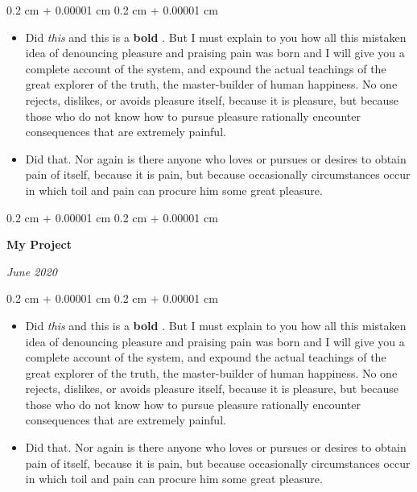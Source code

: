 \documentclass[10pt, letterpaper]{article}
\newenvironment{highlights}{
    \begin{itemize}[
        topsep=0.10 cm,
        parsep=0.10 cm,
        partopsep=0pt,
        itemsep=0pt,
        leftmargin=0.4 cm + 10pt
    ]
}{
    \end{itemize}
} %
\newenvironment{onecolentry}{
    \begin{adjustwidth}{
        0.2 cm + 0.00001 cm
    }{
        0.2 cm + 0.00001 cm
    }
}{
    \end{adjustwidth}
} %
\newenvironment{twocolentry}[2][]{
    \onecolentry
    \def\secondColumn{#2}
    \setcolumnwidth{\fill, 4.5 cm}
    \begin{paracol}{2}
}{
    \switchcolumn \raggedleft \secondColumn
    \end{paracol}
    \endonecolentry
} %
\let\hrefWithoutArrow\href
\renewcommand{\href}[2]{\hrefWithoutArrow{#1}{\ifthenelse{\equal{#2}{}}{ }{#2 }\raisebox{.15ex}{\footnotesize \faExternalLink*}}}
\begin{document}
        \vspace{0.10 cm}
        \begin{onecolentry}
            \begin{highlights}
                \item Did \textit{this} and this is a \textbf{bold} \href{https://example.com}{link}. But I must explain to you how all this mistaken idea of denouncing pleasure and praising pain was born and I will give you a complete account of the system, and expound the actual teachings of the great explorer of the truth, the master-builder of human happiness. No one rejects, dislikes, or avoids pleasure itself, because it is pleasure, but because those who do not know how to pursue pleasure rationally encounter consequences that are extremely painful.
                \item Did that. Nor again is there anyone who loves or pursues or desires to obtain pain of itself, because it is pain, but because occasionally circumstances occur in which toil and pain can procure him some great pleasure.
            \end{highlights}
        \end{onecolentry}


        \vspace{0.2 cm}

        \begin{twocolentry}{
            
            
        \textit{June 2020}}
            \textbf{My Project}
        \end{twocolentry}

        \vspace{0.10 cm}
        \begin{onecolentry}
            \begin{highlights}
                \item Did \textit{this} and this is a \textbf{bold} \href{https://example.com}{link}. But I must explain to you how all this mistaken idea of denouncing pleasure and praising pain was born and I will give you a complete account of the system, and expound the actual teachings of the great explorer of the truth, the master-builder of human happiness. No one rejects, dislikes, or avoids pleasure itself, because it is pleasure, but because those who do not know how to pursue pleasure rationally encounter consequences that are extremely painful.
                \item Did that. Nor again is there anyone who loves or pursues or desires to obtain pain of itself, because it is pain, but because occasionally circumstances occur in which toil and pain can procure him some great pleasure.
            \end{highlights}
        \end{onecolentry}
\end{document}
